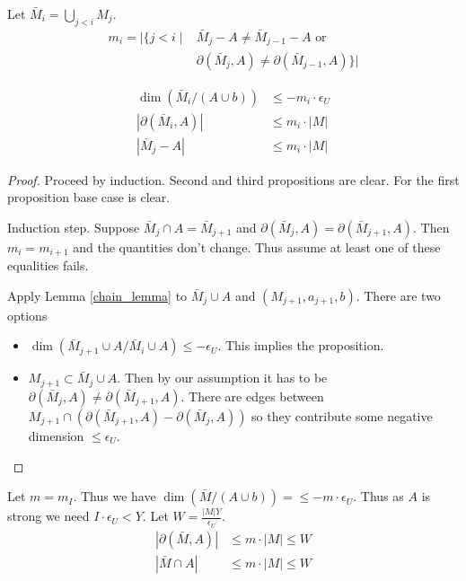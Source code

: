 \documentclass{amsart}
\begin{document}
Let $\bar M_i = \bigcup_{j < i} M_j$.
\begin{align*}
	m_i = |\{j < i \mid 
	&\bar M_j - A \neq \bar M_{j-1} - A \text{ or }\\
	&\partial(\bar M_j, A) \neq \partial(\bar M_{j-1}, A)\}|
\end{align*}

\begin{Lemma}
	\begin{align*}
		\dim(\bar M_i / (A \cup b)) &\leq -m_i \cdot \epsilon_U \\
		|\partial(\bar M_i, A)| &\leq m_i \cdot |M| \\
		|\bar M_j - A| &\leq m_i \cdot |M|
	\end{align*}
\end{Lemma}


\begin{proof}
	Proceed by induction.
	Second and third propositions are clear.
	For the first proposition base case is clear.
	
	Induction step.
	Suppose $\bar M_j \cap A = \bar M_{j+1}$ and $\partial(\bar M_j, A) = \partial(\bar M_{j+1}, A)$.
	Then $m_i = m_{i+1}$ and the quantities don't change.
	Thus assume at least one of these equalities fails.
	
	Apply Lemma \ref{chain_lemma} to $\bar M_j \cup A$ and $(M_{j+1}, a_{j+1},b)$.
	There are two options
	
	\begin{itemize}
		\item $\dim(\bar M_{j+1} \cup A / \bar M_i \cup A) \leq -\epsilon_U$.
		This implies the proposition.
		\item $M_{j+1} \subset \bar M_j \cup A$.
		Then by our assumption it has to be $\partial(\bar M_j, A) \neq \partial(\bar M_{j+1}, A)$.
		There are edges between $M_{j+1} \cap (\partial(\bar M_{j+1}, A) - \partial(\bar M_j, A))$ so they contribute some negative dimension $\leq \epsilon_U$.
	\end{itemize}
\end{proof}

Let $m = m_I$.
Thus we have $\dim(\bar M / (A \cup b)) = \leq -m \cdot \epsilon_U $.
Thus as $A$ is strong we need $I \cdot \epsilon_U < Y$.
Let $W = \frac{|M|Y}{\epsilon_U}$.
\begin{align*}
	|\partial(\bar M, A)| &\leq m \cdot |M| \leq W \\
	|\bar M \cap A| &\leq m \cdot |M| \leq W
\end{align*}
\end{document}
